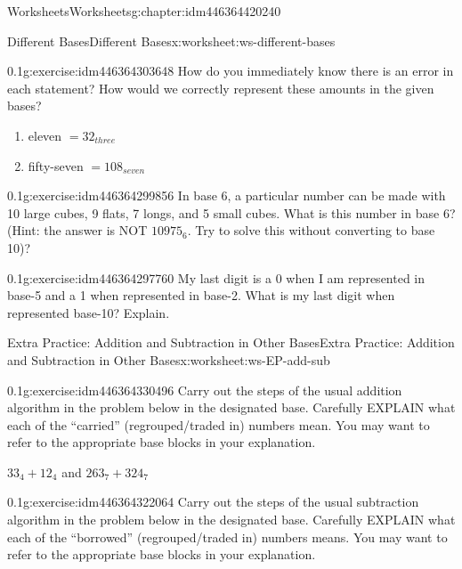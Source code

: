 \documentclass[twoside,11pt,]{book}
\begin{document}
\begin{chapterptx}{Worksheets}{}{Worksheets}{}{}{g:chapter:idm446364420240}
\begin{worksheet-section-numberless}{Different Bases}{}{Different Bases}{}{}{x:worksheet:ws-different-bases}
\begin{divisionexercise}{5}{}{0.1}{g:exercise:idm446364303648}%
How do you immediately know there is an error in each statement?  How would we correctly represent these amounts in the given bases?%
%
\begin{enumerate}[label=(\alph*)]
\item{}eleven \(= 32_{three}\)%
\item{}fifty-seven \(= 108_{seven}\)%
\end{enumerate}
\end{divisionexercise}%
\begin{divisionexercise}{6}{}{0.1}{g:exercise:idm446364299856}%
In base 6, a particular number can be made with 10 large cubes, 9 flats, 7 longs, and 5 small cubes.  What is this number in base 6? (Hint: the answer is NOT \(10975_6 \). Try to solve this without converting to base 10)?%
\end{divisionexercise}%
\begin{divisionexercise}{7}{}{0.1}{g:exercise:idm446364297760}%
My last digit is a 0 when I am represented in base-5 and a 1 when represented in base-2.  What is my last digit when represented base-10? Explain.%
\end{divisionexercise}%
\end{worksheet-section-numberless}
\restoregeometry
%
%
\typeout{************************************************}
\typeout{************************************************}
%
\begin{worksheet-section-numberless}{Extra Practice: Addition and Subtraction in Other Bases}{}{Extra Practice: Addition and Subtraction in Other Bases}{}{}{x:worksheet:ws-EP-add-sub}
\begin{divisionexercise}{1}{}{0.1}{g:exercise:idm446364330496}%
Carry out the steps of the usual addition algorithm in the problem below in the designated base.  Carefully EXPLAIN what each of the “carried” (regrouped\slash{}traded in) numbers mean.  You may want to refer to the appropriate base blocks in your explanation.%
\par
\(33_4+12_4\) and \(263_7+324_7\)%
\end{divisionexercise}%
\begin{divisionexercise}{2}{}{0.1}{g:exercise:idm446364322064}%
Carry out the steps of the usual subtraction algorithm in the problem below in the designated base.  Carefully EXPLAIN what each of the “borrowed” (regrouped\slash{}traded in) numbers means.  You may want to refer to the appropriate base blocks in your explanation.%

\end{divisionexercise}
\end{worksheet-section-numberless}
\end{chapterptx}
\end{document}
